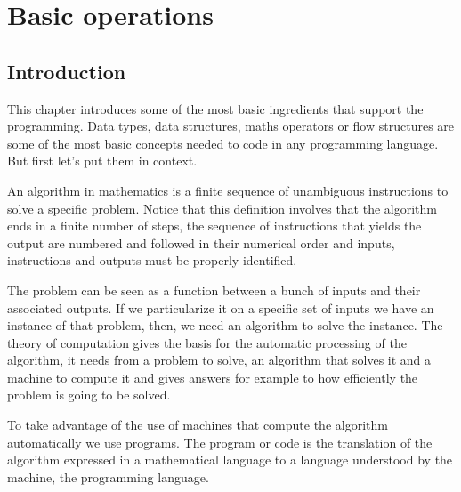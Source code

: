 \chapter{Basic operations} \label{chap:basicop}


    \section{Introduction} 
This chapter introduces some of the most basic ingredients that support the programming.
Data types, data structures, maths operators or flow structures are some of the most basic concepts needed to code in any programming language. 
But first let's put them in context. 

An algorithm in mathematics is a finite sequence of unambiguous instructions to solve a specific problem. 
Notice that this definition involves that the algorithm ends in a finite number of steps, 
the sequence of instructions that yields the output are numbered and followed in their numerical order and
inputs, instructions and outputs must be properly identified. 

The problem can be seen as a function between a bunch of inputs and their associated outputs.
If we particularize it on a specific set of inputs we have an instance of that problem, 
then, we need an algorithm to solve the instance.
The theory of computation gives the basis for the automatic processing of the algorithm, it needs from a 
problem to solve, an algorithm that solves it and a machine to compute it 
and gives answers for example to how efficiently the problem is going to be solved. 

To take advantage of the use of machines that compute the algorithm automatically we use programs.
The program or code is the translation of the algorithm expressed in a mathematical language to a language understood by 
the machine, the programming language. 

